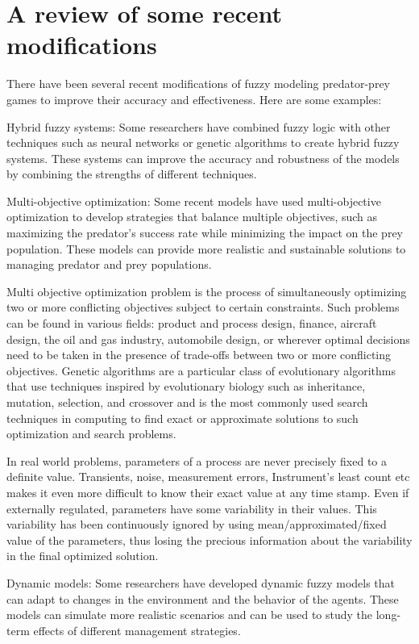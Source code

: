 \section{A review of some recent modifications} \label{sec:defects}


There have been several recent modifications of fuzzy modeling predator-prey games to improve their accuracy and effectiveness. Here are some examples:

Hybrid fuzzy systems: Some researchers have combined fuzzy logic with other techniques such as neural networks or genetic algorithms to create hybrid fuzzy systems. These systems can improve the accuracy and robustness of the models by combining the strengths of different techniques. 

Multi-objective optimization: Some recent models have used multi-objective optimization to develop strategies that balance multiple objectives, such as maximizing the predator's success rate while minimizing the impact on the prey population. These models can provide more realistic and sustainable solutions to managing predator and prey populations. 

Multi objective optimization problem is the process of simultaneously optimizing two or more
conflicting objectives subject to certain constraints. Such problems can be found in various
fields: product and process design, finance, aircraft design, the oil and gas industry, automobile
design, or wherever optimal decisions need to be taken in the presence of trade‐offs between
two or more conflicting objectives. Genetic algorithms are a particular class of evolutionary
algorithms that use techniques inspired by evolutionary biology such as inheritance, mutation,
selection, and crossover and is the most commonly used search techniques in computing to find
exact or approximate solutions to such optimization and search problems.


In real world problems, parameters of a process are never precisely fixed to a definite value.
Transients, noise, measurement errors, Instrument’s least count etc makes it even more difficult
to know their exact value at any time stamp. Even if externally regulated, parameters have some
variability in their values. This variability has been continuously ignored by using
mean/approximated/fixed value of the parameters, thus losing the precious information about
the variability in the final optimized solution.

Dynamic models: Some researchers have developed dynamic fuzzy models that can adapt to changes in the environment and the behavior of the agents. These models can simulate more realistic scenarios and can be used to study the long-term effects of different management strategies.

